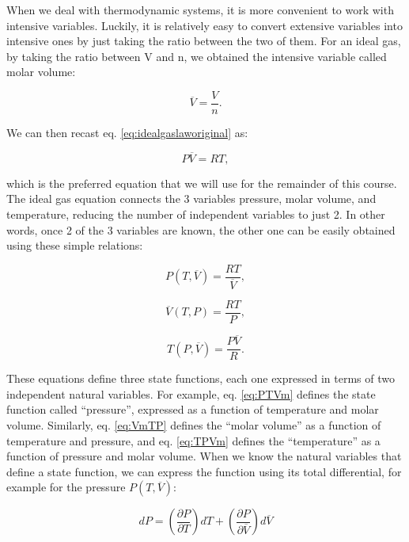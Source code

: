 \documentclass[
  9pt,
]{extbook}
\theoremstyle{definition}
\theoremstyle{definition}
\theoremstyle{definition}
\theoremstyle{remark}
\begin{document}
When we deal with thermodynamic systems, it is more convenient to work with intensive variables. Luckily, it is relatively easy to convert extensive variables into intensive ones by just taking the ratio between the two of them. For an ideal gas, by taking the ratio between V and n, we obtained the intensive variable called molar volume:

\begin{equation}
  \overline{V}=\frac{V}{n}.   
  \label{eq:Vmdef}
\end{equation}

We can then recast eq. \eqref{eq:idealgaslaworiginal} as:

\begin{equation}
  P\overline{V}=RT,
  \label{eq:idealgaslaw}
\end{equation}

which is the preferred equation that we will use for the remainder of this course.
The ideal gas equation connects the 3 variables pressure, molar volume, and temperature, reducing the number of independent variables to just 2. In other words, once 2 of the 3 variables are known, the other one can be easily obtained using these simple relations:

\begin{equation}
  P(T,\overline{V})=\frac{RT}{\overline{V}},
  \label{eq:PTVm}
\end{equation}

\begin{equation}
  \overline{V}(T,P)=\frac{RT}{P},
  \label{eq:VmTP}
 \end{equation}

\begin{equation}
  T(P,\overline{V})=\frac{P\overline{V}}{R}.
  \label{eq:TPVm}
\end{equation}

These equations define three state functions, each one expressed in terms of two independent natural variables. For example, eq. \eqref{eq:PTVm} defines the state function called ``pressure'', expressed as a function of temperature and molar volume. Similarly, eq. \eqref{eq:VmTP} defines the ``molar volume'' as a function of temperature and pressure, and eq. \eqref{eq:TPVm} defines the ``temperature'' as a function of pressure and molar volume. When we know the natural variables that define a state function, we can express the function using its total differential, for example for the pressure \(P(T, \overline{V})\):

\begin{equation}
  dP=\left( \frac{\partial P}{\partial T} \right)dT + \left( \frac{\partial P}{\partial \overline{V}} \right)d\overline{V}
  \label{eq:totaldifferentialP}
\end{equation}
\end{document}
